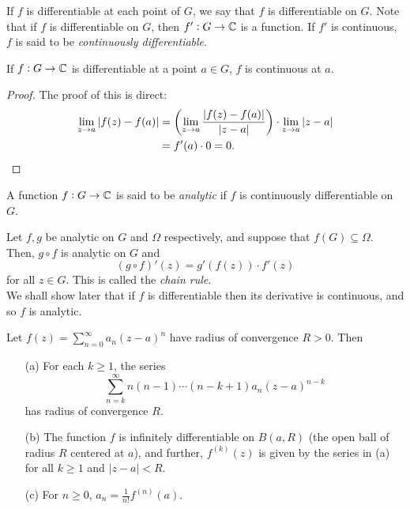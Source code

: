	If $f$ is differentiable at each point of $G$, we say that $f$ is differentiable on $G$. Note that if $f$ is differentiable on $G$, then $f' : G \to \mathbb{C}$ is a function. If $f'$ is continuous, $f$ is said to be \emph{continuously differentiable}.

	\begin{theorem}
		If $f : G \to \mathbb{C}$ is differentiable at a point $a \in G$, $f$ is continuous at $a$.
	\end{theorem}
	\begin{proof}
		The proof of this is direct:
		\begin{align*}
			\lim_{z \to a} |f(z) - f(a)| &= \left( \lim_{z \to a} \frac{|f(z)-f(a)|}{|z-a|} \right) \cdot \lim_{z\to a} |z-a| \\
				&= f'(a) \cdot 0 = 0. \qedhere
		\end{align*}
	\end{proof}

	\begin{fdef}
		A function $f : G \to \mathbb{C}$ is said to be \emph{analytic} if $f$ is continuously differentiable on $G$.
	\end{fdef}

	Let $f,g$ be analytic on $G$ and $\Omega$ respectively, and suppose that $f(G) \subseteq \Omega$. Then, $g \circ f$ is analytic on $G$ and
	\[ (g \circ f)'(z) = g'(f(z)) \cdot f'(z) \]
	for all $z \in G$. This is called the \emph{chain rule}.\\

	We shall show later that if $f$ is differentiable then its derivative is continuous, and so $f$ is analytic.

	\begin{ftheo}
		Let $f(z) = \sum_{n=0}^\infty a_n (z-a)^n$ have radius of convergence $R > 0$. Then
		\begin{itemize}
			\item[(a)] For each $k \ge 1$, the series
			\[ \sum_{n=k}^\infty n(n-1)\cdots(n-k+1) a_n (z-a)^{n-k} \]
			has radius of convergence $R$.

			\item[(b)] The function $f$ is infinitely differentiable on $B(a,R)$ (the open ball of radius $R$ centered at $a$), and further, $f^{(k)}(z)$ is given by the series in (a) for all $k \ge 1$ and $|z-a| < R$.

			\item[(c)] For $n \ge 0$, $a_n = \frac{1}{n!} f^{(n)}(a)$. 
		\end{itemize}
	\end{ftheo}

